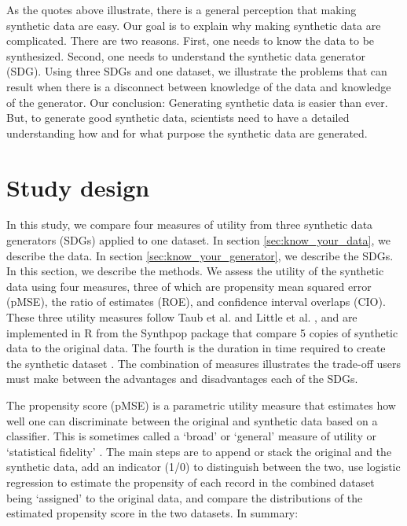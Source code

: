 \documentclass[runningheads]{llncs}
\begin{document}
As the quotes above illustrate, there is a general perception that making synthetic data are easy.  Our goal is to explain why making synthetic data are complicated.  There are two reasons.  First, one needs to know the data to be synthesized.  Second, one needs to understand the synthetic data generator (SDG).   Using three SDGs and one dataset, we illustrate the problems that can result when there is a disconnect between knowledge of the data and knowledge of the generator.  Our conclusion: Generating synthetic data is easier than ever. But, to generate good synthetic data, scientists need to have a detailed understanding how and for what purpose the synthetic data are generated.

\section{Study design}\label{sec:study_design}

In this study, we compare four measures of utility from three synthetic data generators (SDGs) applied to one dataset.  In section \ref{sec:know_your_data}, we describe the data.  In section \ref{sec:know_your_generator}, we describe the SDGs.  In this section, we describe the methods.  We assess the utility of the synthetic data using four measures, three of which are propensity mean squared error (pMSE), the ratio of estimates (ROE), and confidence interval overlaps (CIO).  These three utility measures follow Taub et al. \cite{taub2020impact} and Little et al. \cite{little2022comparing}, and are implemented in \textsf{R} from the Synthpop package that compare 5 copies of synthetic data to the original data.  The fourth is the duration in time required to create the synthetic dataset \cite{jordon2022synthetic}.  The combination of measures illustrates the trade-off users must make between the advantages and disadvantages each of the SDGs.

The propensity score \cite{woo2009global,snoke2018general} (pMSE) is a parametric utility measure that estimates how well one can discriminate between the original and synthetic data based on a classifier.  This is sometimes called a `broad'\cite{snoke2018general} or `general'\cite{drechsler2009disclosure} measure of utility or `statistical fidelity' \cite{jordon2022synthetic}.  The main steps are to append or stack the original and the synthetic data, add an indicator (1/0) to distinguish between the two, use logistic regression to estimate the propensity of each record in the combined dataset being `assigned' to the original data, and compare the distributions of the estimated propensity score in the two datasets.  In summary:
\end{document}
